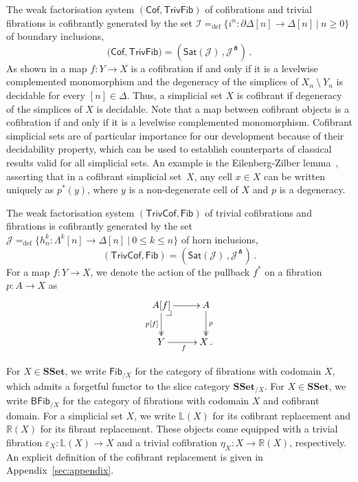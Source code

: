 \documentclass[reqno,10pt,a4paper,oneside,draft]{amsart}
\makeatletter
\numberwithin{equation}{section}
\theoremstyle{mythm}
\theoremstyle{mydef}
\theoremstyle{myrmk}
\newcommand{\pullback}[1]{\save*!/#1-1.2pc/#1:(-1,1)@^{|-}\restore}
\newcommand{\drpullback}{\pullback{dr}}
\newcommand{\ie}{\text{i.e.\ }}
\newcommand{\defeq}{=_{\operatorname{def}}}
\newcommand{\co}{\colon}
\newcommand{\SSet}{\mathbf{SSet}}
\newcommand{\cal}[1]{\mathcal{#1}}
\newcommand{\Cof}{\mathsf{Cof}}
\newcommand{\TrivFib}{\mathsf{TrivFib}}
\newcommand{\Fib}{\mathsf{Fib}}
\newcommand{\TrivCof}{\mathsf{TrivCof}}
\newcommand{\BFFib}{\mathsf{BFib}}
\makeatother
\begin{document}
The weak factorisation system $(\Cof, \TrivFib)$ of cofibrations and trivial fibrations  is cofibrantly generated by the set $\cal{I} \defeq \{ i^n \co  \partial \Delta[n] \to \Delta[n] \ | \ n \geq 0 \}$  of boundary 
inclusions, \ie 
\[
\big( \Cof, \TrivFib \big) = ( \mathsf{Sat}(\cal{J}) \, , \cal{J}^\pitchfork) \, .
\]
As shown in \cite[Proposition~5.1.4]{henry2018wms} a map $f \co Y \to X$ is a cofibration if  and only if 
it is a levelwise complemented monomorphism and the degeneracy of the simplices of $X_n ~\setminus~Y_n$ is decidable for every $[n] \in \Delta$. Thus, a simplicial set $X$ is
cofibrant if  degeneracy of the simplices of $X$ is decidable.
Note that a map between cofibrant objects is a cofibration
if and only if it is a levelwise complemented monomorphism. 
Cofibrant simplicial sets are of particular importance for our development because of their decidability property, which can be used to establish counterparts of classical results valid for all simplicial sets. An example is the Eilenberg-Zilber lemma~\cite[Lemma~5.1.2]{henry2018wms}, asserting that in a cofibrant simplicial set~$X$, any cell $x \in X$ can be written uniquely as $p^*(y)$, where $y$ is a non-degenerate cell of $X$ and $p$ is a degeneracy. 
\medskip

The weak factorisation system $(\TrivCof, \Fib)$ of  trivial cofibrations and fibrations is cofibrantly 
generated by the set $\cal{J} \defeq \{ h^k_n  \co \Lambda^k[n] \to \Delta[n]  \ | \ 0 \leq k \leq n \}$ of horn 
inclusions, \ie 
\[
(\TrivCof, \Fib) = ( \mathsf{Sat}(\cal{J}) \, , \cal{J}^\pitchfork) \, .
\] 
For a map $f \co Y \to X$, we denote the action of the pullback $f^*$ on a fibration~$p \co A \to X$ as
\[
\xymatrix{
A[f] \ar[r] \drpullback \ar@{->>}[d]_{p[f]} & A \ar@{->>}[d]^{p} \\
Y \ar[r]_f & X \, .}
\]


For $X \in \SSet$, we write $\Fib_{/X}$ for the category of fibrations with codomain $X$, which admits a forgetful functor to 
the slice category $\SSet_{/X}$. For $X \in \SSet$, we write $\BFFib_{/X}$ for the category of fibrations with codomain $X$ and cofibrant domain. For a simplicial set $X$, we write $\mathbb{L}(X)$ for its cofibrant replacement and $\mathbb{R}(X)$ for its
fibrant replacement. These objects come equipped with a trivial fibration $\varepsilon_X \co \mathbb{L}(X) \to X$ and a trivial cofibration $\eta_X \co 
X \to \mathbb{R}(X)$, respectively. An explicit definition of the cofibrant replacement is given 
in Appendix~\ref{sec:appendix}.
\end{document}
